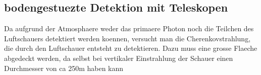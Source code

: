 \subsection{bodengestuezte Detektion mit Teleskopen}
Da aufgrund der Atmosphaere weder das primaere Photon noch die Teilchen des Luftschauers detektiert werden koennen, versucht man die Cherenkovstrahlung, die durch den Luftschauer entsteht zu detektieren. Dazu muss eine grosse Flaeche abgedeckt werden, da selbst bei vertikaler Einstrahlung der Schauer einen Durchmesser von ca 250m haben kann %
